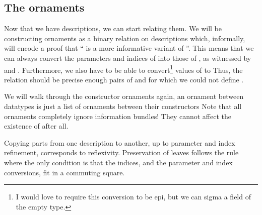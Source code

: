 




\subsection{The ornaments}
Now that we have descriptions, we can start relating them. We will be constructing ornaments as a binary relation on descriptions
which, informally, will encode a proof that `` is a more informative variant of ''. This means that we can always convert the parameters and indices of  into those of , as witnessed by  and . Furthermore, we also have to be able to convert\footnote{I would love to require this conversion to be epi, but we can sigma a field of the empty type.} values of  to 
Thus, the relation should be precise enough pairs of  and  for which we could not define .

We will walk through the constructor ornaments
again, an ornament between datatypes is just a list of ornaments between their constructors
Note that all ornaments completely ignore information bundles! They cannot affect the existence of  after all.

Copying parts from one description to another, up to parameter and index refinement, corresponds to reflexivity. Preservation of leaves follows the rule
where the only condition is that the indices, and the parameter and index conversions, fit in a commuting square.

